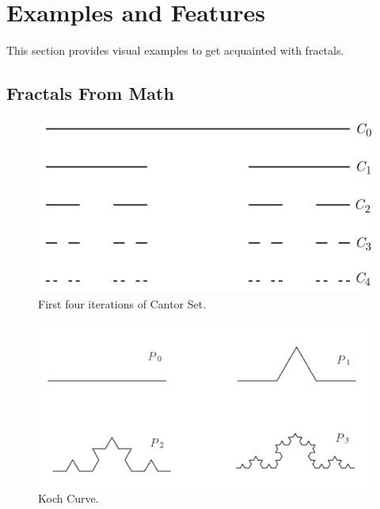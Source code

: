 \section{Examples and Features}
This section provides visual examples to get acquainted with fractals.
\subsection{Fractals From Math}
\begin{figure}[h!]
  \includegraphics[width=\linewidth]{Pictures/cantor_set.png}
  \caption{First four iterations of Cantor Set.}
  \label{fig:cantor_set}
\end{figure}
\begin{figure}[h!]
  \includegraphics[width=\linewidth]{Pictures/koch_curve.png}
  \caption{Koch Curve.}
  \label{fig:cantor_set}
\end{figure}
